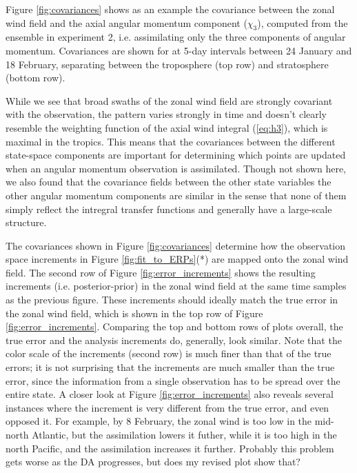 Figure \ref{fig:covariances} shows as an example the covariance between the zonal wind field and the axial angular momentum component ($\chi_3$), computed from the ensemble in experiment 2, i.e. assimilating only the three components of angular momentum.
Covariances are shown for at 5-day intervals between 24 January and 18 February, \textcolor{unsure}{separating between the troposphere (top row) and stratosphere (bottom row)}. 

While we see that broad swaths of the zonal wind field are strongly covariant with the observation, the pattern varies strongly in time and doesn't clearly resemble the weighting function of the axial wind integral (\ref{eq:h3}), which is maximal in the tropics.
This means that the covariances between the different state-space components are important for determining which points are updated when an angular momentum observation is assimilated. 
Though not shown here, we also found that the covariance fields between the other state variables the other angular momentum components are similar in the sense that none of them simply reflect the intregral transfer functions and generally have a large-scale structure.  

The covariances shown in Figure \ref{fig:covariances} determine how the observation space increments in Figure \ref{fig:fit_to_ERPs}(*) are mapped onto the zonal wind field. 
The second row of Figure \ref{fig:error_increments} shows the resulting increments (i.e. posterior-prior) in the zonal wind field at the same time samples as the previous figure. 
These increments should ideally match the true error in the zonal wind field, which is shown in the top row of Figure \ref{fig:error_increments}.  
\textcolor{unsure}{Comparing the top and bottom rows of plots overall, the true error and the analysis increments do, generally, look similar.} 
Note that the color scale of the increments (second row) is much finer than that of the true errors; it is not surprising that the increments are much smaller than the true error, since the information from a single observation has to be spread over the entire state. 
A closer look at Figure  \ref{fig:error_increments} also reveals several instances where the increment is very different from the true error, and even opposed it. 
For example, by 8 February,  the zonal wind is too low in the mid-north Atlantic, but the assimilation lowers it futher, while it is too high in the north Pacific, and the assimilation increases it further. 
\textcolor{alert}{Probably this problem gets worse as the DA progresses, but does my revised plot show that?}

